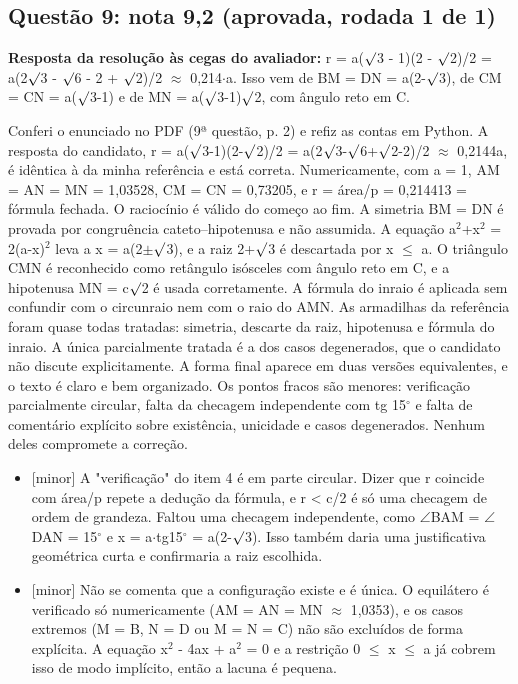 \documentclass{article}%
\begin{document}
\subsection*{Questão 9: nota 9,2 (aprovada, rodada 1 de 1)}%
\textbf{Resposta da resolução às cegas do avaliador:} r = a($\surd$3 - 1)(2 - $\surd$2)/2 = a(2$\surd$3 - $\surd$6 - 2 + $\surd$2)/2 $\approx$ 0,214$\cdot$a. Isso vem de BM = DN = a(2-$\surd$3), de CM = CN = a($\surd$3-1) e de MN = a($\surd$3-1)$\surd$2, com ângulo reto em C.\par %
Conferi o enunciado no PDF (9ª questão, p. 2) e refiz as contas em Python. A resposta do candidato, r = a($\surd$3-1)(2-$\surd$2)/2 = a(2$\surd$3-$\surd$6+$\surd$2-2)/2 $\approx$ 0,2144a, é idêntica à da minha referência e está correta. Numericamente, com a = 1, AM = AN = MN = 1,03528, CM = CN = 0,73205, e r = área/p = 0,214413 = fórmula fechada. O raciocínio é válido do começo ao fim. A simetria BM = DN é provada por congruência cateto--hipotenusa e não assumida. A equação a$^2$+x$^2$ = 2(a-x)$^2$ leva a x = a(2$\pm$$\surd$3), e a raiz 2+$\surd$3 é descartada por x $\leq$ a. O triângulo CMN é reconhecido como retângulo isósceles com ângulo reto em C, e a hipotenusa MN = c$\surd$2 é usada corretamente. A fórmula do inraio é aplicada sem confundir com o circunraio nem com o raio do AMN. As armadilhas da referência foram quase todas tratadas: simetria, descarte da raiz, hipotenusa e fórmula do inraio. A única parcialmente tratada é a dos casos degenerados, que o candidato não discute explicitamente. A forma final aparece em duas versões equivalentes, e o texto é claro e bem organizado. Os pontos fracos são menores: verificação parcialmente circular, falta da checagem independente com tg 15$^\circ$ e falta de comentário explícito sobre existência, unicidade e casos degenerados. Nenhum deles compromete a correção.%
\begin{itemize}%
\item%
{[}minor{]} A "verificação" do item 4 é em parte circular. Dizer que r coincide com área/p repete a dedução da fórmula, e r < c/2 é só uma checagem de ordem de grandeza. Faltou uma checagem independente, como $\angle$BAM = $\angle$DAN = 15$^\circ$ e x = a$\cdot$tg15$^\circ$ = a(2-$\surd$3). Isso também daria uma justificativa geométrica curta e confirmaria a raiz escolhida.%
\item%
{[}minor{]} Não se comenta que a configuração existe e é única. O equilátero é verificado só numericamente (AM = AN = MN $\approx$ 1,0353), e os casos extremos (M = B, N = D ou M = N = C) não são excluídos de forma explícita. A equação x$^2$ - 4ax + a$^2$ = 0 e a restrição 0 $\leq$ x $\leq$ a já cobrem isso de modo implícito, então a lacuna é pequena.%

\end{itemize}$$
\end{document}
